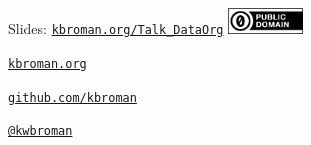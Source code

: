 \documentclass[aspectratio=169,12pt,t]{beamer}
\begin{document}
\begin{frame}[c]{}

\Large

Slides: \href{https://kbroman.org/Talk_DataOrg}{\tt kbroman.org/Talk\_DataOrg}
\hfill \includegraphics[height=7mm]{Figs/cc-zero.png}

\vspace{7mm}

\href{https://kbroman.org}{\tt \lolit kbroman.org}

\vspace{7mm}

\href{https://github.com/kbroman}{\tt \lolit github.com/kbroman}

\vspace{7mm}

\href{https://twitter.com/kwbroman}{\tt \lolit @kwbroman}



\end{frame}
\end{document}
